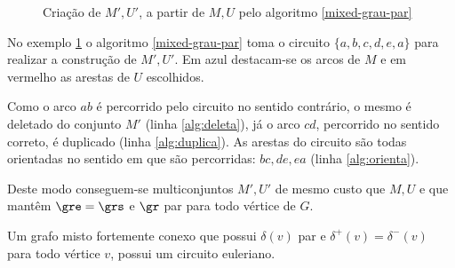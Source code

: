 \begin{figure}[H]
\begin{minipage}{.5\textwidth}
          \label{exmixed2}
        \end{minipage}%
        \caption{Criação de $M', U'$, a partir de $M, U$ pelo algoritmo \ref{mixed-grau-par}}
        \label{ex-grau-par}
    \end{figure}

    No exemplo \ref{ex-grau-par} o algoritmo \ref{mixed-grau-par} toma o circuito $\{a, b, c, d, e, a\}$ para realizar a construção de $M', U'$. 
    Em azul destacam-se os arcos de $M$ e em vermelho as arestas de $U$ escolhidos.

    Como o arco $ab$ é percorrido pelo circuito no sentido contrário, o mesmo é deletado do conjunto $M'$ (linha \ref{alg:deleta}), já o arco $cd$, percorrido no sentido correto, é duplicado (linha \ref{alg:duplica}).
    As arestas do circuito são todas orientadas no sentido em que são percorridas: $bc, de, ea$ (linha \ref{alg:orienta}).

    Deste modo conseguem-se multiconjuntos $M', U'$ de mesmo custo que $M, U$ e que mantêm $\gre = \grs$ e $\gr$ par para todo vértice de $G$.

    \begin{theorem} 
        Um grafo misto fortemente conexo que possui $\delta(v)$ par e $\delta^+(v) = \delta^-(v)$ para todo vértice $v$, possui um circuito euleriano.
        \label{mixed-eulerian}
    \end{theorem}

